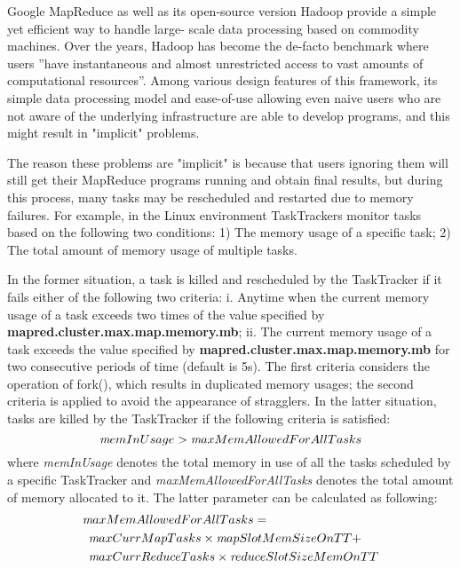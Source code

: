 Google MapReduce as well as its open-source version Hadoop provide a simple yet efficient way to handle large- scale data processing based on commodity machines.
Over the years, Hadoop has become the de-facto benchmark\cite{hayashibara2004varphi} where users ”have instantaneous and almost unrestricted access to vast amounts of computational resources”.
Among various design features of this framework, its simple data processing model and ease-of-use allowing even naive users who are not aware of the underlying infrastructure are able to develop programs, and this might result in "implicit" problems.
\par
The reason these problems are "implicit" is because that users ignoring them will still get their MapReduce programs running and obtain final results, but during this process, many tasks may be rescheduled and restarted due to memory failures. 
For example, in the Linux environment TaskTrackers monitor tasks based on the following two conditions:  1) The memory usage of a specific task; 2) The total amount of memory usage of multiple tasks. 
\par
In the former situation, a task is killed and rescheduled by the TaskTracker if it fails either of the following two criteria:
i. Anytime when the current memory usage of a task exceeds two times of the value specified by {\bf mapred.cluster.max.map.memory.mb};
ii. The current memory usage of a task exceeds the value specified by {\bf mapred.cluster.max.map.memory.mb} for two consecutive periods of time (default is 5s). 
The first criteria considers the operation of fork(), which results in duplicated memory usages; the second criteria is applied to avoid the appearance of stragglers.
In the latter situation, tasks are killed by the TaskTracker if the following criteria is satisfied:
\begin{equation}
{\emph memInUsage} > {\emph maxMemAllowedForAllTasks} 
\end{equation}
where \emph {memInUsage} denotes the total memory in use of all the tasks scheduled by a specific TaskTracker and \emph {maxMemAllowedForAllTasks} denotes the total amount of memory allocated to it. The latter parameter can be calculated as following:
\begin{equation*}
\begin{aligned}
&{\emph maxMemAllowedForAllTasks} = \\
& \hspace {5pt} {\emph maxCurrMapTasks} \times {\emph mapSlotMemSizeOnTT} + \\
& \hspace {5pt} {\emph maxCurrReduceTasks} \times {\emph reduceSlotSizeMemOnTT}
\end{aligned}
\end{equation*}
